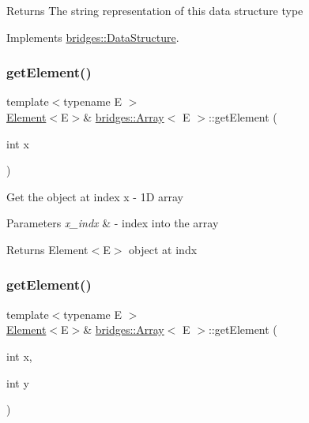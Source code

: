 \begin{DoxyReturn}{Returns}
The string representation of this data structure type 
\end{DoxyReturn}


Implements \mbox{\hyperlink{classbridges_1_1_data_structure_a957a63b106e340bc753620c650632bdc}{bridges\+::\+Data\+Structure}}.

\mbox{\label{classbridges_1_1_array_a8b4c6cc491829d814e0b6b0ce3654417}} 
\subsubsection{\texorpdfstring{get\+Element()}{getElement()}\hspace{0.1cm}{\footnotesize\ttfamily [1/3]}}
{\footnotesize\ttfamily template$<$typename E $>$ \\
\mbox{\hyperlink{classbridges_1_1_element}{Element}}$<$E$>$\& \mbox{\hyperlink{classbridges_1_1_array}{bridges\+::\+Array}}$<$ E $>$\+::get\+Element (\begin{DoxyParamCaption}\item[{int}]{x }\end{DoxyParamCaption})\hspace{0.3cm}{\ttfamily [inline]}}

Get the object at index x -\/ 1D array


\begin{DoxyParams}{Parameters}
{\em x\+\_\+indx} & -\/ index into the array\\
\hline
\end{DoxyParams}
\begin{DoxyReturn}{Returns}
Element$<$\+E$>$ object at \textquotesingle{}indx\textquotesingle{} 
\end{DoxyReturn}
\mbox{\label{classbridges_1_1_array_acd5e730e0369b1fa699a5907e889f213}} 
\subsubsection{\texorpdfstring{get\+Element()}{getElement()}\hspace{0.1cm}{\footnotesize\ttfamily [2/3]}}
{\footnotesize\ttfamily template$<$typename E $>$ \\
\mbox{\hyperlink{classbridges_1_1_element}{Element}}$<$E$>$\& \mbox{\hyperlink{classbridges_1_1_array}{bridges\+::\+Array}}$<$ E $>$\+::get\+Element (\begin{DoxyParamCaption}\item[{int}]{x,  }\item[{int}]{y }\end{DoxyParamCaption})\hspace{0.3cm}{\ttfamily [inline]}}

